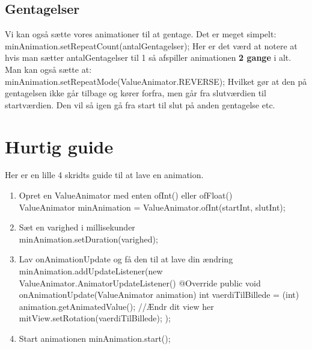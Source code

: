 \subsection{Gentagelser}
Vi kan også sætte vores animationer til at gentage. Det er meget simpelt:
	minAnimation.setRepeatCount(antalGentagelser);
Her er det værd at notere at hvis man sætter antalGentagelser til 1 så afspiller animationen \textbf{2 gange} i alt.
Man kan også sætte at:
	minAnimation.setRepeatMode(ValueAnimator.REVERSE);
Hvilket gør at den på gentagelsen ikke går tilbage og kører forfra, men går fra slutværdien til startværdien. Den vil så igen gå fra start til slut på anden gentagelse etc.
\section{Hurtig guide} %
Her er en lille 4 skridts guide til at lave en animation.
\begin{enumerate}
	\item Opret en ValueAnimator med enten ofInt() eller ofFloat() \\
		ValueAnimator minAnimation = ValueAnimator.ofInt(startInt, slutInt);
	\item Sæt en varighed i millisekunder \\
		minAnimation.setDuration(varighed);
	\item Lav onAnimationUpdate og få den til at lave din ændring
		minAnimation.addUpdateListener(new ValueAnimator.AnimatorUpdateListener() {
			@Override
			public void onAnimationUpdate(ValueAnimator animation) {
				int vaerdiTilBillede = (int) animation.getAnimatedValue();
				//Ændr dit view her
				mitView.setRotation(vaerdiTilBillede);
			}
		});
	\item Start animationen
		minAnimation.start();
\end{enumerate}
